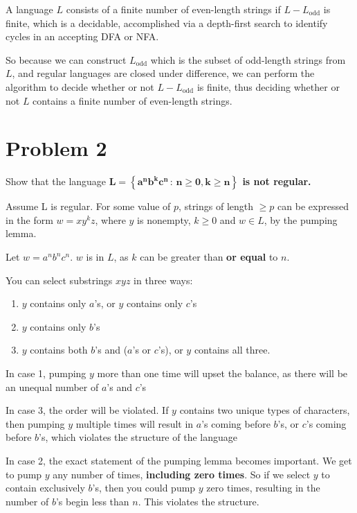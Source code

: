 \documentclass{report}
\begin{document}
A language $L$ consists of a finite number of even-length strings if $L - L_\text{odd}$ is finite, which is a decidable, accomplished via a depth-first search to identify cycles in an accepting DFA or NFA.

So because we can construct $L_\text{odd}$ which is the subset of odd-length strings from $L$, and regular languages are closed under difference, we can perform the algorithm to decide whether or not $L - L_\text{odd}$ is finite, thus deciding whether or not $L$ contains a finite number of even-length strings.

 
\section*{Problem 2}

Show that the language
\textbf{$\mathbf{L = \left\{a^n b^k c^n \, : \, n \geq 0, k \geq n\right\}}$ is not regular.}

Assume L is regular. For some value of $p$, strings of length $\geq p$ can be expressed in the form $w = xy^kz$, where $y$ is nonempty, $k \geq 0$ and $w \in L$, by the pumping lemma.


Let $w = a^n b^n c^n$. $w$ is in $L$, as $k$ can be greater than \textbf{or equal} to $n$.

You can select substrings $xyz$ in three ways:
\begin{enumerate}
\item $y$ contains only $a$'s, or $y$ contains only $c$'s
\item $y$ contains only $b$'s
\item $y$ contains both $b$'s and ($a$'s or $c$'s), or $y$ contains all three.
\end{enumerate}

In case 1, pumping $y$ more than one time will upset the balance, as there will be an unequal number of $a$'s and $c$'s

In case 3, the order will be violated. If $y$ contains two unique types of characters, then pumping $y$ multiple times will result in $a$'s coming before $b$'s, or $c$'s coming before $b$'s, which violates the structure of the language

In case 2, the exact statement of the pumping lemma becomes important. We get to pump $y$ any number of times, \textbf{including zero times}.
So if we select $y$ to contain exclusively $b$'s, then you could pump $y$ zero times, resulting in the number of $b$'s begin less than $n$.
This violates the structure.
\end{document}
